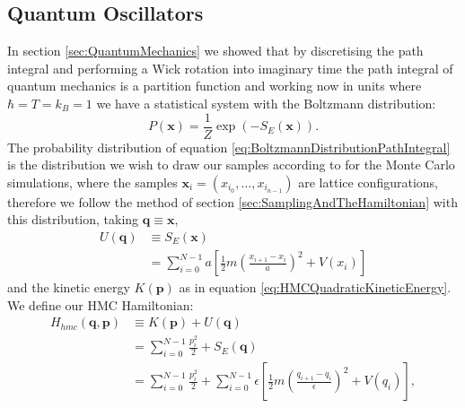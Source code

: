 \documentclass[12pt]{article}
\begin{document}
    \subsection{Quantum Oscillators}
    In section \ref{sec:QuantumMechanics} we showed that by discretising the path integral and performing a Wick rotation into imaginary time the path integral of quantum mechanics is a partition function and working now in units where $\hbar=T=k_B=1$ we have a statistical system with the Boltzmann distribution:
    \begin{equation}
        \label{eq:BoltzmannDistributionPathIntegral}
        P\left(\bm{x}\right) = \frac{1}{Z}\exp{\left(-S_E\left(\bm{x}\right)\right)}.
    \end{equation}
    The probability distribution of equation \ref{eq:BoltzmannDistributionPathIntegral} is the distribution we wish to draw our samples according to for the Monte Carlo simulations, where the samples $\bm{x}_i=\left(x_{i_{0}},\dots,x_{i_{n-1}}\right)$ are lattice configurations, therefore we follow the method of section \ref{sec:SamplingAndTheHamiltonian} with this distribution, taking $\bm{q}\equiv\bm{x}$,
    \begin{align}
        \label{eq:QuantumHMCPotential}
        U\left(\bm{q}\right) & \equiv S_E\left(\bm{x}\right) \\
                             & = \sum_{i=0}^{N-1} a \left[\frac{1}{2}m\left(\frac{x_{i+1}-x_{i}}{a}\right)^2 + V(x_i)\right]
    \end{align} 
    and the kinetic energy $K\left(\bm{p}\right)$ as in equation \ref{eq:HMCQuadraticKineticEnergy}. We define our HMC Hamiltonian:
    \begin{align}
        \label{eq:HMCQuantumMechanicalHamiltonian1}
        H_{hmc}\left(\bm{q},\bm{p}\right) & \equiv K\left(\bm{p}\right) + U\left(\bm{q}\right)\\
        \label{eq:HMCQuantumMechanicalHamiltonian2} & = \sum_{i=0}^{N-1} \frac{p_i^2}{2} + S_E\left(\bm{q}\right) \\
        \label{eq:HMCQuantumMechanicalHamiltonian3}& = \sum_{i=0}^{N-1} \frac{p_i^2}{2} + \sum_{i=0}^{N-1} \epsilon \left[\frac{1}{2}m\left(\frac{q_{i+1}-q_{i}}{\epsilon}\right)^2 + V\left(q_i\right)\right],
    \end{align} 
\end{document}

